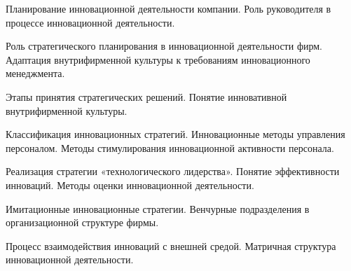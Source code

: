 \documentclass[
	14pt,
	a4paper,
	]
	{scrartcl}
\begin{document}
\vfill

\newpage


\shapk
{}
\setcounter{zad}{0}

\vfill
\z Планирование инновационной деятельности компании.
 \vfill
\z Роль руководителя в процессе инновационной деятельности.
 \vfill

\vfill

\newpage


\shapk
{}
\setcounter{zad}{0}

\vfill
\z Роль стратегического планирования в инновационной деятельности фирм.
 \vfill
\z Адаптация внутрифирменной культуры к требованиям инновационного менеджмента.
 \vfill

\vfill

\newpage


\shapk
{}
\setcounter{zad}{0}

\vfill
\z Этапы принятия стратегических решений.
 \vfill
\z Понятие инновативной внутрифирменной культуры.
 \vfill

\vfill

\newpage


\shapk
{}
\setcounter{zad}{0}

\vfill
\z Классификация инновационных стратегий.
 \vfill
\z Инновационные методы управления персоналом. Методы стимулирования инновационной активности персонала.
 \vfill

\vfill

\newpage


\shapk
{}
\setcounter{zad}{0}

\vfill
\z Реализация стратегии «технологического лидерства».
 \vfill
\z Понятие эффективности инноваций. Методы оценки инновационной деятельности.
 \vfill

\vfill

\newpage


\shapk
{}
\setcounter{zad}{0}

\vfill
\z Имитационные инновационные стратегии.
 \vfill
\z Венчурные подразделения в организационной структуре фирмы.
 \vfill

\vfill

\newpage


\shapk
{}
\setcounter{zad}{0}

\vfill
\z Процесс взаимодействия инноваций с внешней средой.
 \vfill
\z Матричная структура инновационной деятельности.
 \vfill
\end{document}
